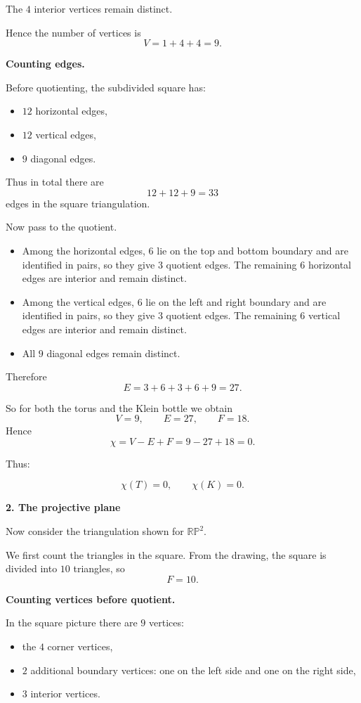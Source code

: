 \documentclass[12pt,a4paper]{article}
\theoremstyle{notespace}
\begin{document}
The \(4\) interior vertices remain distinct.

Hence the number of vertices is
\[
V = 1 + 4 + 4 = 9.
\]

\medskip

\textbf{Counting edges.}

Before quotienting, the subdivided square has:
\begin{itemize}
	\item \(12\) horizontal edges,
	\item \(12\) vertical edges,
	\item \(9\) diagonal edges.
\end{itemize}
Thus in total there are
\[
12+12+9=33
\]
edges in the square triangulation.

Now pass to the quotient.

\begin{itemize}
	\item Among the horizontal edges, \(6\) lie on the top and bottom boundary and are identified in pairs, so they give \(3\) quotient edges. The remaining \(6\) horizontal edges are interior and remain distinct.
	\item Among the vertical edges, \(6\) lie on the left and right boundary and are identified in pairs, so they give \(3\) quotient edges. The remaining \(6\) vertical edges are interior and remain distinct.
	\item All \(9\) diagonal edges remain distinct.
\end{itemize}

Therefore
\[
E = 3+6+3+6+9 = 27.
\]

So for both the torus and the Klein bottle we obtain
\[
V=9,\qquad E=27,\qquad F=18.
\]
Hence
\[
\chi = V-E+F = 9-27+18 = 0.
\]

Thus:

\[
\boxed{\chi(T)=0}, \qquad \boxed{\chi(K)=0}.
\]

\bigskip

\textbf{2. The projective plane}

Now consider the triangulation shown for \(\mathbb{RP}^2\).

We first count the triangles in the square. From the drawing, the square is divided into \(10\) triangles, so
\[
F=10.
\]

\medskip

\textbf{Counting vertices before quotient.}

In the square picture there are \(9\) vertices:

\begin{itemize}
	\item the \(4\) corner vertices,
	\item \(2\) additional boundary vertices: one on the left side and one on the right side,
	\item \(3\) interior vertices.
\end{itemize}
\end{document}
